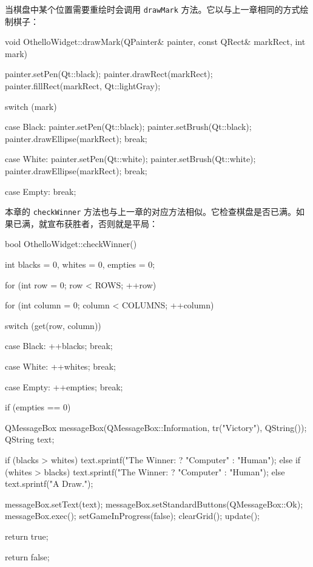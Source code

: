 \begin{codebox}
  if (!checkWinner()) {
    calculateComputerMove();
    update();
    checkWinner();
  }
}
\end{codebox}

当棋盘中某个位置需要重绘时会调用 \texttt{drawMark} 方法。它以与上一章相同的方式绘制棋子：

\begin{codebox}
void OthelloWidget::drawMark(QPainter& painter,
                             const QRect& markRect, int mark) {
  painter.setPen(Qt::black);
  painter.drawRect(markRect);
  painter.fillRect(markRect, Qt::lightGray);

  switch (mark) {
    case Black:
      painter.setPen(Qt::black);
      painter.setBrush(Qt::black);
      painter.drawEllipse(markRect);
      break;

    case White:
      painter.setPen(Qt::white);
      painter.setBrush(Qt::white);
      painter.drawEllipse(markRect);
      break;

    case Empty:
      break;
  }
}
\end{codebox}

本章的 \texttt{checkWinner} 方法也与上一章的对应方法相似。它检查棋盘是否已满。如果已满，就宣布获胜者，否则就是平局：

\begin{codebox}
bool OthelloWidget::checkWinner() {
  int blacks = 0, whites = 0, empties = 0;

  for (int row = 0; row < ROWS; ++row) {
    for (int column = 0; column < COLUMNS; ++column) {
      switch (get(row, column)) {
        case Black:
          ++blacks;
          break;

        case White:
          ++whites;
          break;

        case Empty:
          ++empties;
          break;
      }
    }
  }

  if (empties == 0) {
    QMessageBox messageBox(QMessageBox::Information,
                           tr("Victory"), QString());
    QString text;

    if (blacks > whites) {
      text.sprintf("The Winner: %
                                      ? "Computer" : "Human");
    }
    else if (whites > blacks) {
      text.sprintf("The Winner: %
                                      ? "Computer" : "Human");
    }
    else {
      text.sprintf("A Draw.");
    }

    messageBox.setText(text);
    messageBox.setStandardButtons(QMessageBox::Ok);
    messageBox.exec();
    setGameInProgress(false);
    clearGrid();
    update();

    return true;
  }

  return false;
}
\end{codebox}

